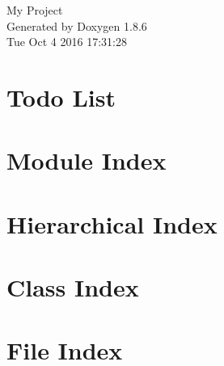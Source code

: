 \documentclass[twoside]{book}
\newcommand{\clearemptydoublepage}{%
  \newpage{\pagestyle{empty}\cleardoublepage}%
}
\begin{document}
\hypersetup{pageanchor=false}
\begin{titlepage}
\vspace*{7cm}
\begin{center}%
{\Large My Project }\\
\vspace*{1cm}
{\large Generated by Doxygen 1.8.6}\\
\vspace*{0.5cm}
{\small Tue Oct 4 2016 17:31:28}\\
\end{center}
\end{titlepage}
\clearemptydoublepage
\tableofcontents
\clearemptydoublepage
{}
\hypersetup{pageanchor=true}

\chapter{Todo List}
\label{todo}
\hypertarget{todo}{}

\chapter{Module Index}

\chapter{Hierarchical Index}

\chapter{Class Index}

\chapter{File Index}

\end{document}
